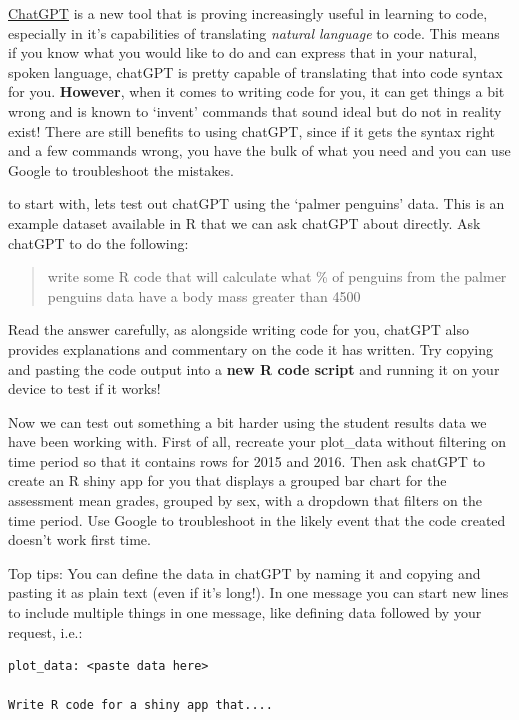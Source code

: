 \documentclass[
  12pt,
]{article}
\begin{document}
\href{https://openai.com/}{ChatGPT} is a new tool that is proving
increasingly useful in learning to code, especially in it's capabilities
of translating \emph{natural language} to code. This means if you know
what you would like to do and can express that in your natural, spoken
language, chatGPT is pretty capable of translating that into code syntax
for you. \textbf{However}, when it comes to writing code for you, it can
get things a bit wrong and is known to `invent' commands that sound
ideal but do not in reality exist! There are still benefits to using
chatGPT, since if it gets the syntax right and a few commands wrong, you
have the bulk of what you need and you can use Google to troubleshoot
the mistakes.

to start with, lets test out chatGPT using the `palmer penguins' data.
This is an example dataset available in R that we can ask chatGPT about
directly. Ask chatGPT to do the following:

\begin{quote}
write some R code that will calculate what \% of penguins from the
palmer penguins data have a body mass greater than 4500
\end{quote}

Read the answer carefully, as alongside writing code for you, chatGPT
also provides explanations and commentary on the code it has written.
Try copying and pasting the code output into a \textbf{new R code
script} and running it on your device to test if it works!

Now we can test out something a bit harder using the student results
data we have been working with. First of all, recreate your plot\_data
without filtering on time period so that it contains rows for 2015 and
2016. Then ask chatGPT to create an R shiny app for you that displays a
grouped bar chart for the assessment mean grades, grouped by sex, with a
dropdown that filters on the time period. Use Google to troubleshoot in
the likely event that the code created doesn't work first time.

Top tips: You can define the data in chatGPT by naming it and copying
and pasting it as plain text (even if it's long!). In one message you
can start new lines to include multiple things in one message, like
defining data followed by your request, i.e.:

\begin{verbatim}
plot_data: <paste data here>

Write R code for a shiny app that....
\end{verbatim}
\end{document}
